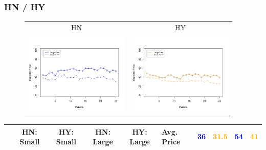 \documentclass[red]{beamer}
\begin{document}
\begin{frame}
\frametitle{HN / HY}
\begin{figure} [h] 
\begin{center}
\begin{tabular}{c c}
HN & HY \\
\includegraphics[width=5cm,height=4cm]{HN - FIRM (1).jpeg} & \includegraphics[width=5cm,height=4cm]{HY - FIRM (1).jpeg}
\end{tabular}
\end{center}
\end{figure}
\begin{center}
 \begin{adjustbox}{width=10cm, totalheight=1.5cm}
\begin{tabular}{ |c|c|c|c|c| } 
 \hline
   & HN: Small & HY: Small & HN: Large & HY: Large &
   Avg. Price & \textcolor{blue}{36 } & \textcolor{orange}{31.5} &  \textcolor{blue}{ 54} & \textcolor{orange}{41} \\
 \hline
\end{tabular}
 \end{adjustbox}
\end{center}
\end{frame}
\end{document}
